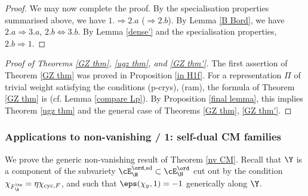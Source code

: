 \begin{proof}
We may now  complete the proof. By the specialisation properties summarised above, we have $1.\Rightarrow 2.a$ ($\Rightarrow 2.b$). By Lemma \ref{B Bord}, we have $2.a \Rightarrow 3.a$, $2.b \Leftrightarrow 3.b$.
 By Lemma \ref{dense'} and the specialisation properties, $2.b\Rightarrow 1.$
\end{proof}


\begin{proof}[{Proof of Theorems \ref{GZ thm},  \ref{ugz thm}, and \ref{GZ thm'}}] The first assertion of Theorem \ref{GZ thm} was proved in Proposition \ref{in H1f}.
For a representation $\Pi$ of trivial weight satisfying the conditions (p-crys), (ram), the  formula of Theorem \ref{GZ thm} is \cite[Theorem B]{nonsplit} (cf. Lemma \ref{compare Lp}).
  By Proposition \ref{final lemma}, this implies  Theorem \ref{ugz thm} and the general case  of Theorems \ref{GZ thm},   \ref{GZ thm'}.
\end{proof}



\subsubsection{Applications to non-vanishing / 1: self-dual CM families} 
We prove the generic non-vanishing result of  Theorem \ref{nv CM}. Recall that $\Y$ is a component of the subvariety $\cE_{\H}^{\ord , \rm sd}\subset\cE_{\H}^{\ord}$ cut out by the condition $\chi_{F_{\A}^{\ts}}=\eta \chi_{{\rm cyc}, F}$, and such that $\eps(\chi_{y}, 1)=-1$ generically along $\Y$.


